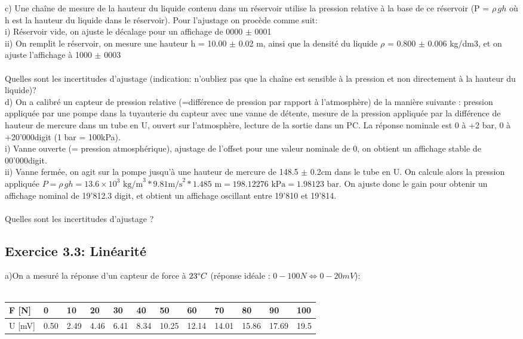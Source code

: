 \documentclass[main.tex]{subfiles}
\begin{document}
c)	Une chaîne de mesure de la hauteur du liquide contenu dans un réservoir utilise la pression relative à la base de ce réservoir (P = $\rho\,gh$ où h est la hauteur du liquide dans le réservoir). Pour l'ajustage on procède comme suit: \\
i)	Réservoir vide, on ajuste le décalage pour un affichage de 0000  $\pm$  0001 \\
ii)	On remplit le réservoir, on mesure une hauteur h = 10.00 $\pm$ 0.02 m, ainsi que la densité du liquide  $\rho$ = 0.800  $\pm$  0.006 kg/dm3, et on ajuste l'affichage à 1000  $\pm$  0003 \\ ~ \\
Quelles sont les incertitudes d'ajustage (indication: n'oubliez pas que la chaîne est sensible à la pression et non directement à la hauteur du liquide)? \\

d)	On a calibré un capteur de pression relative (=différence de pression par rapport à l'atmosphère) de la manière suivante : pression appliquée par une pompe dans la tuyauterie du capteur avec une vanne de détente, mesure de la pression appliquée par la différence de hauteur de mercure dans un tube en U, ouvert sur l'atmosphère, lecture de la sortie dans un PC. La réponse nominale est 0 à +2 bar, 0 à +20'000digit (1 bar = 100kPa). \\
i)	Vanne ouverte (= pression atmosphérique), ajustage de l'offset pour une valeur nominale de 0, on obtient un affichage stable de 00'000digit. \\
ii)	Vanne fermée, on agit sur la pompe jusqu'à une hauteur de mercure de 148.5 $\pm$ 0.2cm dans le tube en U. On calcule alors la pression appliquée $P=\rho\,gh = 13.6\times10^3 \text{ kg/m}^3 * 9.81\text {m/s}^2 * 1.485\text{ m}=198.12276\text{ kPa} = 1.98123\text{ bar}$. On ajuste donc le gain pour obtenir un affichage nominal de 19'812.3 digit, et obtient un affichage oscillant entre 19'810 et 19'814. \\ ~\\
Quelles sont les incertitudes d'ajustage ?

\subsection*{Exercice 3.3: Linéarité}

a)On a mesuré la réponse d'un capteur de force à $23 \degree C$ (réponse idéale : $0-100N \Leftrightarrow 0-20 mV$):\\
~
\\
\begin{tabular}{|l|l|l|l|l|l|l|l|l|l|l|l|}
    \hline
    F [N]  & 0    & 10   & 20   & 30   & 40   & 50    & 60    & 70    & 80    & 90    & 100  \\
    \hline
    U [mV] & 0.50 & 2.49 & 4.46 & 6.41 & 8.34 & 10.25 & 12.14 & 14.01 & 15.86 & 17.69 & 19.5 \\
    \hline
\end{tabular}
\\
\end{document}
